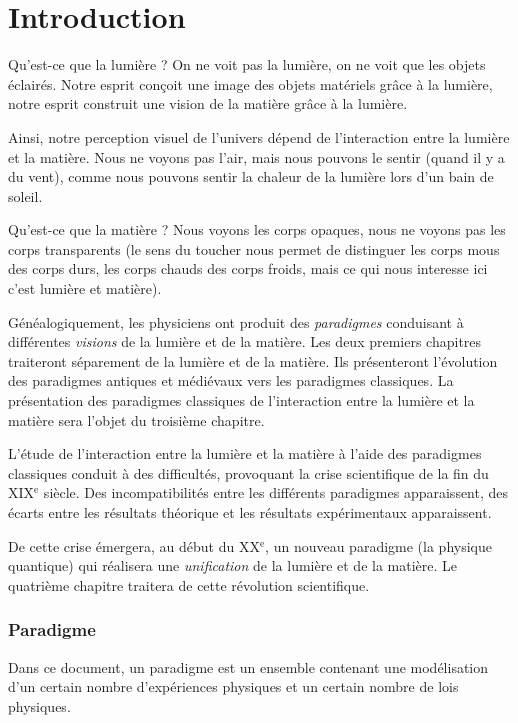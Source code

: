 \chapter{Introduction}

Qu'est-ce que la lumière ? On ne voit pas la lumière, on ne voit que les objets éclairés. Notre esprit conçoit une image des objets matériels grâce à la lumière, notre esprit construit une vision de la matière grâce à la lumière.

Ainsi, notre perception visuel de l'univers dépend de l'interaction entre la lumière et la matière. Nous ne voyons pas l'air, mais nous pouvons le sentir (quand il y a du vent), comme nous pouvons sentir la chaleur de la lumière lors d'un bain de soleil.

Qu'est-ce que la matière ? Nous voyons les corps opaques, nous ne voyons pas les corps transparents (le sens du toucher nous permet de distinguer les corps mous des corps durs, les corps chauds des corps froids, mais ce qui nous interesse ici c'est lumière et matière). 

Généalogiquement, les physiciens ont produit des {\it paradigmes} conduisant à différentes {\it visions} de la lumière et de la matière.
Les deux premiers chapitres traiteront séparement de la lumière et de la matière. Ils présenteront l'évolution des paradigmes antiques et médiévaux vers les paradigmes classiques.
La présentation des paradigmes classiques de l'interaction entre la lumière et la matière sera l'objet du troisième chapitre.

L'étude de l'interaction entre la lumière et la matière à l'aide des paradigmes classiques conduit à des difficultés, provoquant la crise scientifique de la fin du {\footnotesize XIX}$^\text{e}$ siècle. Des incompatibilités entre les différents paradigmes apparaissent, des écarts entre les résultats théorique et les résultats expérimentaux apparaissent.

De cette crise émergera, au début du {\footnotesize XX}$^\text{e}$, un nouveau paradigme (la physique quantique) qui réalisera une {\it unification} de la lumière et de la matière.
Le quatrième chapitre traitera de cette révolution scientifique.

\subsection{Paradigme}
Dans ce document, un paradigme est un ensemble contenant une modélisation d'un certain nombre d'expériences physiques et un certain nombre de lois physiques.

